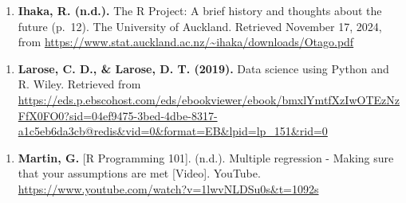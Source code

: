 \documentclass[
]{article}
\providecommand{\tightlist}{%
  \setlength{\itemsep}{0pt}\setlength{\parskip}{0pt}}
\begin{document}
\begin{enumerate}
\def\labelenumi{\arabic{enumi}.}
\setcounter{enumi}{5}
\tightlist
\item
  \textbf{Ihaka, R. (n.d.).} The R Project: A brief history and thoughts
  about the future (p.~12). The University of Auckland. Retrieved
  November 17, 2024, from
  \url{https://www.stat.auckland.ac.nz/~ihaka/downloads/Otago.pdf}
\end{enumerate}

\begin{enumerate}
\def\labelenumi{\arabic{enumi}.}
\setcounter{enumi}{6}
\tightlist
\item
  \textbf{Larose, C. D., \& Larose, D. T. (2019).} Data science using
  Python and R. Wiley. Retrieved from
  \url{https://eds.p.ebscohost.com/eds/ebookviewer/ebook/bmxlYmtfXzIwOTEzNzFfX0FO0?sid=04ef9475-3bed-4dbe-8317-a1c5eb6da3cb@redis&vid=0&format=EB&lpid=lp_151&rid=0}
\end{enumerate}

\begin{enumerate}
\def\labelenumi{\arabic{enumi}.}
\setcounter{enumi}{7}
\tightlist
\item
  \textbf{Martin, G.} {[}R Programming 101{]}. (n.d.). Multiple
  regression - Making sure that your assumptions are met {[}Video{]}.
  YouTube. \url{https://www.youtube.com/watch?v=1lwvNLDSu0s&t=1092s}
\end{enumerate}
\end{document}
